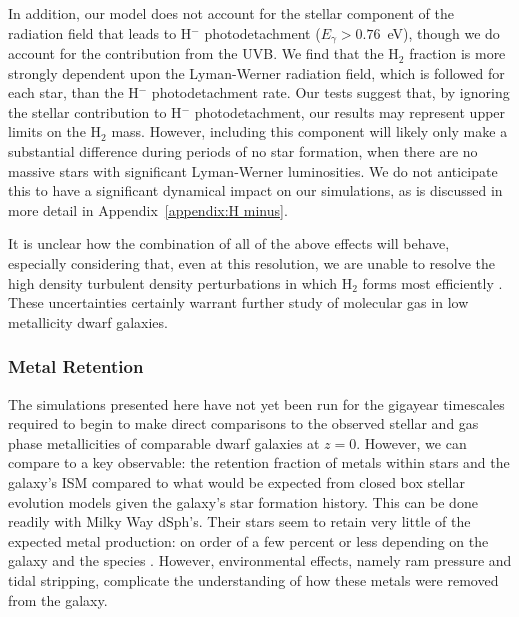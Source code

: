 In addition, our model does not account for the stellar component of the radiation field that leads to H$^{-}$ photodetachment ($E_\gamma > 0.76$~eV), though we do account for the contribution from the UVB. We find that the H$_2$ fraction is more strongly dependent upon the Lyman-Werner radiation field, which is followed for each star, than the H$^{-}$ photodetachment rate. Our tests suggest that, by ignoring the stellar contribution to H$^{-}$ photodetachment, our results may represent upper limits on the H$_2$ mass. However, including this component will likely only make a substantial difference during periods of no star formation, when there are no massive stars with significant Lyman-Werner luminosities. We do not anticipate this to have a significant dynamical impact on our simulations, as is discussed in more detail in Appendix~\ref{appendix:H minus}.

It is unclear how the combination of all of the above effects will behave, especially considering that, even at this resolution, we are unable to resolve the high density turbulent density perturbations in which H$_2$ forms most efficiently \citep{Glover2007}. These uncertainties certainly warrant further study of molecular gas in low metallicity dwarf galaxies.


\subsubsection{Metal Retention}
\label{ch1:sec:obs_metals}

The simulations presented here have not yet been run for the gigayear timescales required to begin to make direct comparisons to the observed stellar and gas phase metallicities of comparable dwarf galaxies at $z = 0$. However, we can compare to a key observable: the retention fraction of metals within stars and the galaxy's ISM compared to what would be expected from closed box stellar evolution models given the galaxy's star formation history. This can be done readily with Milky Way dSph's. Their stars seem to retain very little of the expected metal production: on order of a few percent or less depending on the galaxy and the species \citep{Kirby2011-metals}. However, environmental effects, namely ram pressure and tidal stripping, complicate the understanding of how these metals were removed from the galaxy.


